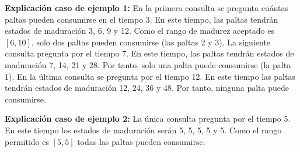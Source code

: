 \documentclass{oci}
\begin{document}
\begin{sampleDescription}
\begin{center}
\begin{minipage}{0.95\textwidth}
\textbf{Explicación caso de ejemplo 1:} En la primera consulta se pregunta cuántas paltas pueden consumirse en el tiempo 3.
En este tiempo, las paltas tendrán estados de maduración 3, 6, 9 y 12.
Como el rango de madurez aceptado es $[6, 10]$, solo dos paltas pueden consumirse (las paltas 2 y 3).
La siguiente consulta pregunta por el tiempo 7.
En este tiempo, las paltas tendrán estados de maduración 7, 14, 21 y 28.
Por tanto, solo una palta puede consumirse (la palta 1).
En la última consulta se pregunta por el tiempo 12.
En este tiempo las paltas tendrán estados de maduración 12, 24, 36 y 48.
Por tanto, ninguna palta puede consumirse.
\end{minipage}
\end{center}

\newpage
{}
\begin{center}
\begin{minipage}{0.95\textwidth}
\textbf{Explicación caso de ejemplo 2:}
La única consulta pregunta por el tiempo 5.
En este tiempo los estados de maduración serán 5, 5, 5, 5 y 5.
Como el rango permitido es $[5, 5]$ todas las paltas pueden consumirse.
\end{minipage}
\end{center}
\end{sampleDescription}
\end{document}
